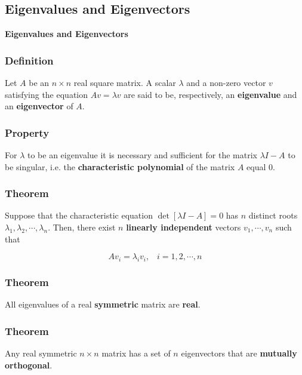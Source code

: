 \begin{frame}
	\section{Eigenvalues and Eigenvectors}
	\begin{center}
	\textbf{Eigenvalues and Eigenvectors}
	\end{center}
\end{frame}

\begin{frame}
	\frametitle{Definition}
	Let $A$ be an $n \times n$ real square matrix. A scalar $\lambda$ and a \alert{non-zero} vector $v$ satisfying the equation $Av = \lambda v$ are said to be, respectively, an \textbf{eigenvalue} and an \textbf{eigenvector} of $A$.
\end{frame}

\begin{frame}
	\frametitle{Property}
	For $\lambda$ to be an eigenvalue it is necessary and sufficient for the matrix $\lambda I - A$ to be singular, i.e. the \textbf{characteristic polynomial} of the matrix $A$ equal $0$.
\end{frame}

\begin{frame}
	\frametitle{Theorem}
	Suppose that the characteristic equation $\det [\lambda I - A] = 0$ has $n$ distinct roots $\lambda_1,\lambda_2,\cdots,\lambda_n$. Then, there exist $n$ \textbf{linearly independent} vectors $v_1,\cdots,v_n$ such that

	$$Av_i = \lambda_iv_i,\hspace{10pt}i=1,2,\cdots,n$$
\end{frame}



\begin{frame}
	\frametitle{Theorem}
	All eigenvalues of a real \textbf{symmetric} matrix are \textbf{real}.
\end{frame}


\begin{frame}
	\frametitle{Theorem}
	Any real symmetric $n \times n$ matrix has a set of $n$ eigenvectors that are \textbf{mutually orthogonal}.
\end{frame}

